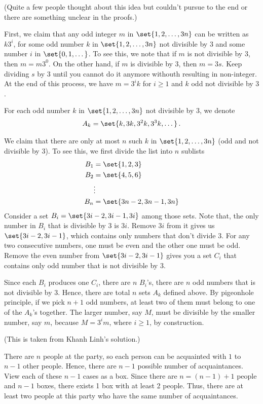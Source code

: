 \documentclass[12pt]{amsart}
\begin{document}
\begin{problem}[Exercise 1.15]
(Quite a few people thought about this idea but couldn't pursue to the end or
there are something unclear in the proofs.)

First, we claim that any odd integer $m$ in $\set{1,2, \dots, 3n}$ can be written as $k 3^i$, for
some odd number $k$ in $\set{1,2, \dots, 3n}$ not divisible by $3$ and some number $i$ in $\set{0, 1, \dots}$.
To see this, we note that if $m$ is not divisible by $3$, then $m = m3^0 $.
On the other hand, if $m$ is divisible by $3$, then $ m = 3 s$. Keep dividing $s$ by $3$ until
you cannot do it anymore withouth resulting in non-integer.
At the end of this process, we have $m = 3^ik$ for $i\geq 1$ and $k$ odd not divisible by $3$.

For each odd number $k$ in $\set{1, 2, \dots, 3n}$ not divisible by $3$, we denote
\begin{align*}
	A_k = \set{k, 3k, 3^2 k, 3^3 k, \dots}\,.
\end{align*}

We claim that there are only at most $n$ such $k$ in $\set{1, 2, \dots, 3n}$ (odd and not divisible by $3$).
To see this, we first divide the list into $n$ sublists
\begin{align*}
	B_1 & = \set{ 1,2,3}         \\
	B_2 & = \set{4,5,6}          \\
	    & \vdots                 \\
	B_n & = \set{3n-2, 3n-1, 3n}
\end{align*}
Consider a set $B_i = \set{3i-2, 3i-1, 3i}$ among those sets.
Note that, the only number in $B_i$ that is divisible by $3$ is $3i$.
Remove $3i$ from it gives us $\set{3i-2, 3i-1}$, which contains only numbers
that don't divide $3$. For any two consecutive numbers, one must be even and the
other one must be odd. Remove the even number from $\set{3i-2 , 3i-1}$
gives you a set $C_i$ that contains only odd number that is not divisible by $3$.

Since each $B_i$ produces one $C_i$, there are $n$ $B_i$'s, there are $n$
odd numbers that is not divisible by $3$.
Hence, there are total $n$ sets $A_k$ defined above.
By pigeonhole principle, if we pick $n+1$ odd numbers,
at least two of them must belong to one of the $A_k$'s
together.
The larger number, say $M$, must be divisible by the smaller number, say $m$,
because $M = 3^i m$, where $i\geq 1$, by construction.
\end{problem}

\begin{problem}[Exercise 1.20](This is taken from Khanh Linh's solution.)

There are $n$ people at the party, so each person can be acquainted with $1$ to $n - 1$
other people.
Hence, there are $n - 1$ possible number of acquaintances. View each of these $n - 1$
cases as a box.
Since there are $n = (n - 1) + 1$ people and $n - 1$ boxes,
there exists 1 box with
at least 2 people.
Thus, there are at least two people at this party who have the same number of
acquaintances.
\end{problem}



\printbibliography
%
%
\end{document}
